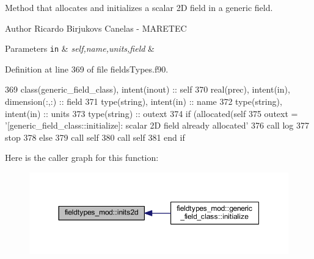 Method that allocates and initializes a scalar 2D field in a generic field. 

\begin{DoxyAuthor}{Author}
Ricardo Birjukovs Canelas -\/ M\+A\+R\+E\+T\+EC 
\end{DoxyAuthor}

\begin{DoxyParams}[1]{Parameters}
\mbox{\tt in}  & {\em self,name,units,field} & \\
\hline
\end{DoxyParams}


Definition at line 369 of file fields\+Types.\+f90.


\begin{DoxyCode}
369     \textcolor{keywordtype}{class}(generic\_field\_class), \textcolor{keywordtype}{intent(inout)} :: self
370     \textcolor{keywordtype}{real(prec)}, \textcolor{keywordtype}{intent(in)}, \textcolor{keywordtype}{dimension(:,:)} :: field
371     \textcolor{keywordtype}{type}(string), \textcolor{keywordtype}{intent(in)} :: name
372     \textcolor{keywordtype}{type}(string), \textcolor{keywordtype}{intent(in)} :: units
373     \textcolor{keywordtype}{type}(string) :: outext
374     \textcolor{keywordflow}{if} (\textcolor{keyword}{allocated}(self%
375         outext = \textcolor{stringliteral}{'[generic\_field\_class::initialize]: scalar 2D field already allocated'}
376         \textcolor{keyword}{call }log%
377         stop
378     \textcolor{keywordflow}{else}
379         \textcolor{keyword}{call }self%
380         \textcolor{keyword}{call }self%
381 \textcolor{keywordflow}{    end if}
\end{DoxyCode}
Here is the caller graph for this function\+:\nopagebreak
\begin{figure}[H]
\begin{center}
\leavevmode
\includegraphics[width=350pt]{namespacefieldtypes__mod_ad3329e97ec60bf9226d19be45ed21859_icgraph}
\end{center}
\end{figure}
\mbox{\label{namespacefieldtypes__mod_a750ce2c729d98ea7031c839a3a5ebd7c}} 
